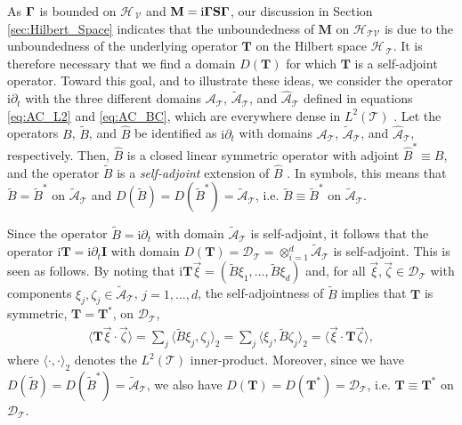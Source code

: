 \documentclass[11pt]{amsart}
\newcommand{\I}{\mathrm{i}}
\newcommand{\Mb}{\mathbf{M}}
\newcommand{\Tb}{\mathbf{T}}
\newcommand{\Ib}{\mathbf{I}}
\newcommand{\Sb}{\mathbf{S}}
\newcommand{\Tc}{\mathcal{T}}
\newcommand{\Vc}{\mathcal{V}}
\newcommand{\Hs}{\mathscr{H}}
\newcommand{\As}{\mathscr{A}}
\newcommand{\Ds}{\mathscr{D}}
\newcommand\bGamma{\mbox{\boldmath${\Gamma}$}}
\begin{document}
As $\bGamma$ is bounded on $\Hs_{\,\Vc}$ and
$\Mb=\I\bGamma\Sb\bGamma$, our discussion in Section
\ref{sec:Hilbert_Space} indicates that the unboundedness of $\Mb$ on
$\Hs_{\Tc\Vc}$ is due to the unboundedness of the underlying operator
$\Tb$ on the Hilbert space $\Hs_{\,\Tc}$. It is therefore necessary
that we find a domain $D(\Tb)$ for which $\Tb$ is a self-adjoint
operator. Toward this goal, and to illustrate these ideas, we consider
the operator $\I\partial_t$ with the three different domains $\As_{\Tc}$,
$\tilde{\As}_{\Tc}$, and $\hat{\As}_{\Tc}$ defined in equations
\eqref{eq:AC_L2} and \eqref{eq:AC_BC}, which are everywhere dense in
$L^2(\Tc)$ \cite{Stone:64}. Let the operators $B$, $\tilde{B}$, and
$\hat{B}$ be identified as $\I\partial_t$ with domains $\As_{\Tc}$,
$\tilde{\As}_{\Tc}$, and $\hat{\As}_{\Tc}$, respectively. Then,
$\hat{B}$ is a closed linear symmetric operator with adjoint
$\hat{B}^*\equiv B$, and the operator $\tilde{B}$ is a \emph{self-adjoint}
extension of $\hat{B}$ \cite{Stone:64}. In symbols, this means that 
$\tilde{B}=\tilde{B}^*$ on $\tilde{\As}_{\Tc}$ and
$D(\tilde{B})=D(\tilde{B}^*)=\tilde{\As}_{\Tc}$,
i.e. $\tilde{B}\equiv\tilde{B}^*$ on $\tilde{\As}_{\Tc}$.     



Since the operator $\tilde{B}=\I\partial_t$ with domain $\tilde{\As}_{\Tc}$ is
self-adjoint, it follows that the operator $\I\Tb=\I\partial_t\Ib$ with domain
$D(\Tb)=\Ds_{\Tc}=\otimes_{i=1}^d\tilde{\As}_{\Tc}$ is self-adjoint. This is
seen as follows. By noting that
$\I\Tb\vec{\xi}=(\tilde{B}\xi_1,\ldots,\tilde{B}\xi_d)$ and, for all 
$\vec{\xi},\vec{\zeta}\in\Ds_{\Tc}$ with components
$\xi_j,\zeta_j\in\tilde{\As}_{\Tc}$, $j=1,\ldots,d$, the self-adjointness of 
$\tilde{B}$ implies that $\Tb$ is symmetric, $\Tb=\Tb^*$, on $\Ds_{\Tc}$, 
%
\begin{align}\label{eq:T_symmetric}
  \langle\Tb\vec{\xi}\cdot\vec{\zeta}\rangle=\sum_j\langle\tilde{B}\xi_j,\zeta_j\rangle_2
                    =\sum_j\langle\xi_j,\tilde{B}\zeta_j\rangle_2
                    =\langle\vec{\xi}\cdot\Tb\vec{\zeta}\rangle,
\end{align}
%
where $\langle\cdot,\cdot\rangle_2$ denotes the $L^2(\Tc)$ inner-product.  Moreover, since we have
$D(\tilde{B})=D(\tilde{B}^*)=\tilde{\As}_{\Tc}$, we also have
$D(\Tb)=D(\Tb^*)=\Ds_{\Tc}$, i.e. $\Tb\equiv\Tb^*$ on $\Ds_{\Tc}$. 
\end{document}
